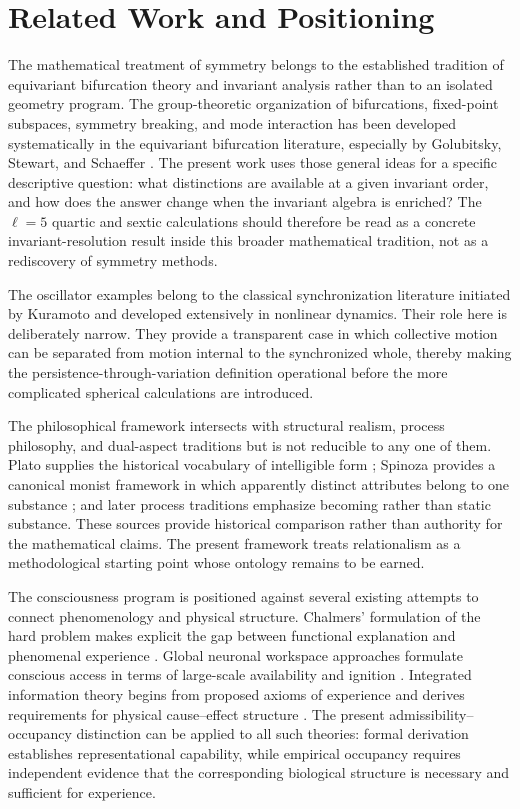 \chapter{Related Work and Positioning}

The mathematical treatment of symmetry belongs to the established tradition of equivariant bifurcation theory and invariant analysis rather than to an isolated geometry program. The group-theoretic organization of bifurcations, fixed-point subspaces, symmetry breaking, and mode interaction has been developed systematically in the equivariant bifurcation literature, especially by Golubitsky, Stewart, and Schaeffer \cite{golubitsky1988SingularitiesII}. The present work uses those general ideas for a specific descriptive question: what distinctions are available at a given invariant order, and how does the answer change when the invariant algebra is enriched? The $\ell=5$ quartic and sextic calculations should therefore be read as a concrete invariant-resolution result inside this broader mathematical tradition, not as a rediscovery of symmetry methods.

The oscillator examples belong to the classical synchronization literature initiated by Kuramoto \cite{kuramoto1975SelfEntrainment} and developed extensively in nonlinear dynamics. Their role here is deliberately narrow. They provide a transparent case in which collective motion can be separated from motion internal to the synchronized whole, thereby making the persistence-through-variation definition operational before the more complicated spherical calculations are introduced.

The philosophical framework intersects with structural realism, process philosophy, and dual-aspect traditions but is not reducible to any one of them. Plato supplies the historical vocabulary of intelligible form \cite{plato1997Complete}; Spinoza provides a canonical monist framework in which apparently distinct attributes belong to one substance \cite{spinoza1994Ethics}; and later process traditions emphasize becoming rather than static substance. These sources provide historical comparison rather than authority for the mathematical claims. The present framework treats relationalism as a methodological starting point whose ontology remains to be earned.

The consciousness program is positioned against several existing attempts to connect phenomenology and physical structure. Chalmers' formulation of the hard problem makes explicit the gap between functional explanation and phenomenal experience \cite{chalmers1995FacingUp}. Global neuronal workspace approaches formulate conscious access in terms of large-scale availability and ignition \cite{dehaene2011ConsciousProcessing}. Integrated information theory begins from proposed axioms of experience and derives requirements for physical cause--effect structure \cite{tononi2016IIT}. The present admissibility--occupancy distinction can be applied to all such theories: formal derivation establishes representational capability, while empirical occupancy requires independent evidence that the corresponding biological structure is necessary and sufficient for experience.

